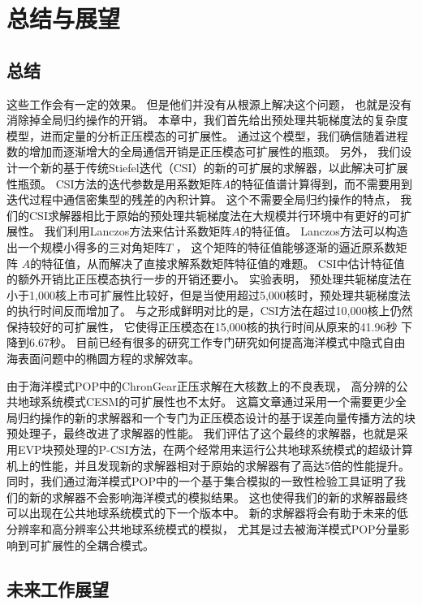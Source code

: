 \chapter{总结与展望}
\label{cha:conclusion}

\section{总结}
\label{sec:conclude}


这些工作会有一定的效果。 
但是他们并没有从根源上解决这个问题， 也就是没有消除掉全局归约操作的开销。 
本章中，我们首先给出预处理共轭梯度法的复杂度模型，进而定量的分析正压模态的可扩展性。 
通过这个模型，我们确信随着进程数的增加而逐渐增大的全局通信开销是正压模态可扩展性的瓶颈。 
另外，  我们设计一个新的基于传统Stiefel迭代（CSI）的新的可扩展的求解器，以此解决可扩展性瓶颈。 
CSI方法的迭代参数是用系数矩阵$A$的特征值谱计算得到，而不需要用到迭代过程中通信密集型的残差的內积计算。
这个不需要全局归约操作的特点， 我们的CSI求解器相比于原始的预处理共轭梯度法在大规模并行环境中有更好的可扩展性。  
我们利用Lanczos方法来估计系数矩阵$A$的特征值。 
Lanczos方法可以构造出一个规模小得多的三对角矩阵$T$ ， 这个矩阵的特征值能够逐渐的逼近原系数矩阵 $A$的特征值，从而解决了直接求解系数矩阵特征值的难题。 
CSI中估计特征值的额外开销比正压模态执行一步的开销还要小。 
实验表明， 预处理共轭梯度法在小于1,000核上市可扩展性比较好，但是当使用超过5,000核时，预处理共轭梯度法的执行时间反而增加了。 
与之形成鲜明对比的是，CSI方法在超过10,000核上仍然保持较好的可扩展性， 它使得正压模态在15,000核的执行时间从原来的41.96秒 下降到6.67秒。    
目前已经有很多的研究工作专门研究如何提高海洋模式中隐式自由海表面问题中的椭圆方程的求解效率。 


由于海洋模式POP中的ChronGear正压求解在大核数上的不良表现， 高分辨的公共地球系统模式CESM的可扩展性也不太好。
这篇文章通过采用一个需要更少全局归约操作的新的求解器和一个专门为正压模态设计的基于误差向量传播方法的块预处理子，最终改进了求解器的性能。 
我们评估了这个最终的求解器，也就是采用EVP块预处理的P-CSI方法，在两个经常用来运行公共地球系统模式的超级计算机上的性能，并且发现新的求解器相对于原始的求解器有了高达5倍的性能提升。
同时，我们通过海洋模式POP中的一个基于集合模拟的一致性检验工具证明了我们的新的求解器不会影响海洋模式的模拟结果。 
这也使得我们的新的求解器最终可以出现在公共地球系统模式的下一个版本中。 
新的求解器将会有助于未来的低分辨率和高分辨率公共地球系统模式的模拟， 尤其是过去被海洋模式POP分量影响到可扩展性的全耦合模式。 



\section{未来工作展望}
\label{sec:futurework}
